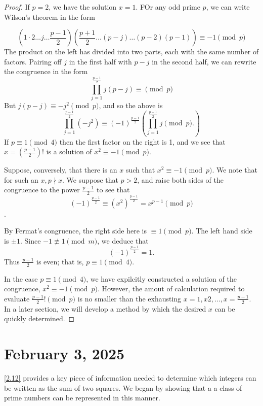 \documentclass[11pt]{article}
\begin{document}
\begin{proof}
	If \(p = 2\), we have the solution \(x = 1\). FOr any odd prime \(p\), we can write Wilson's theorem in the form

	\[\left(1 \cdot 2 \ldots j \ldots \frac{p - 1}{2}\right)\left(\frac{p + 1}{2} \ldots (p - j) \ldots (p - 2)(p - 1)\right) \equiv -1 \pmod{p}\]
	The product on the left has divided into two parts, each with the same number
	of factors. Pairing off \(j\) in the first half with \(p - j\) in the second
	half, we can rewrite the congruence in the form
	\[\prod_{j = 1}^{\frac{p - 1}{2}} j (p - j)\equiv \pmod{p}\]
	But \(j(p - j) \equiv -j^2 \pmod{p}\), and so the above is
	\[\prod_{j = 1}^{\frac{p - 1}{2}}(-j^2) \equiv (-1)^{\frac{p - 1}{2}}\left(\prod_{j = 1}^{\frac{p - 1}{2}} j \pmod{p}.\right)\]
	If \(p \equiv 1 \pmod{4}\) then the first factor on the right is 1, and we see
	that \(x = \left(\frac{p - 1}{2}\right)!\) is a solution of \(x^2 \equiv -1
	\pmod{p}\).

	Suppose, conversely, that there is an \(x\) such that \(x^2 \equiv -1
	\pmod{p}\). We note that for such an \(x, p \nmid x\). We suppose that \(p >
	2\), and raise both sides of the congruence to the power \(\frac{p - 1}{2}\) to
	see that
	\[(-1)^\frac{p - 1}{2} \equiv (x^2)^{\frac{ p - 1}{2}} = x^{p - 1} \pmod{p}\].

	By Fermat's congruence, the right side here is \(\equiv 1 \pmod{p}\). The left
	hand side is \(\pm 1\). Since \(-1 \not \equiv 1 \pmod{m}\), we deduce that \[(-1)^{\frac{p - 1}{2}} = 1.\] Thus \(\frac{p - 1}{2}\) is even; that is, \(p \equiv 1 \pmod{4}\).

	In the case \(p \equiv 1 \pmod {4}\), we have expilcitly constructed a solution
	of the congruence, \(x^2 \equiv -1 \pmod{p}\). However, the amout of
	calculation required to evaluate \(\frac{p - 1}{2}! \pmod{p}\) is no smaller
	than the exhausting \(x = 1, x 2, \ldots, x = \frac{p - 1}{2}\). In a later
	section, we will develop a method by which the desired \(x\) can be quickly
	determined.
\end{proof}

\section{February 3, 2025}

\cref{2.12} provides a key piece of information needed to determine
which integers can be written as the sum of two squares. We began by showing
that a a class of prime numbers can be represented in this manner.
\end{document}

